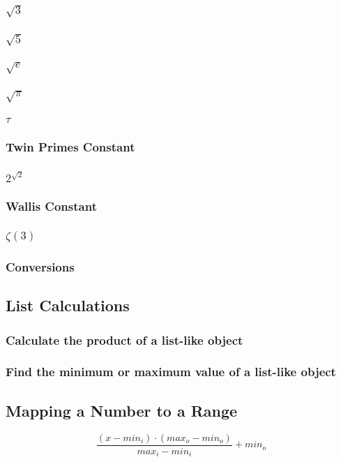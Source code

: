 \documentclass[10pt,a4paper]{report}
\begin{document}
			\subsubsection{$\sqrt{3}$}
			\subsubsection{$\sqrt{5}$}
			\subsubsection{$\sqrt{e}$}
			\subsubsection{$\sqrt{\pi}$}
			\subsubsection{$\tau$}
			\subsubsection{Twin Primes Constant}
			\subsubsection{$2^{\sqrt{2}}$}
			\subsubsection{Wallis Constant}
			\subsubsection{$\zeta(3)$}
			\subsubsection{Conversions}
		\subsection{List Calculations}
			\subsubsection{Calculate the product of a list-like object}
			\subsubsection{Find the minimum or maximum value of a list-like object}
		\subsection{Mapping a Number to a Range}
			$$\frac{(x - min_i)\cdot(max_o - min_o)}{max_i - min_i} + min_o$$
\end{document}
